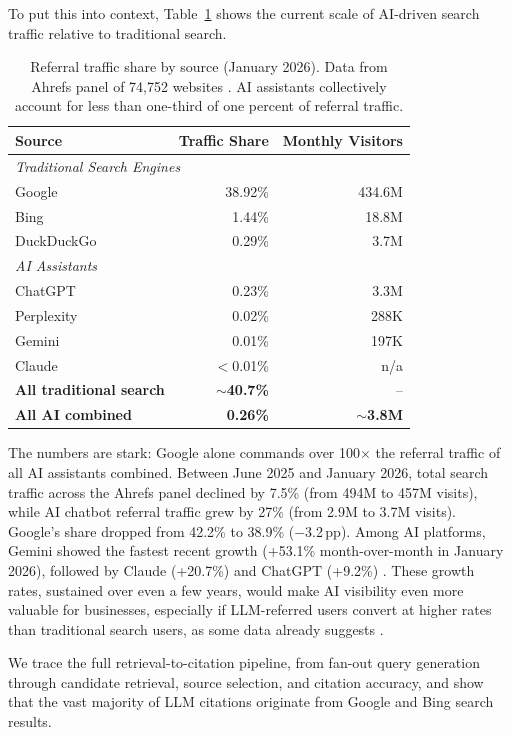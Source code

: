 To put this into context, Table~\ref{tab:traffic-share} shows the current scale of AI-driven search traffic relative to traditional search.
\begin{table}[htbp]
\centering
\caption{Referral traffic share by source (January 2026). Data from Ahrefs panel of 74,752 websites \parencite{ahrefs2026chatgptvsgoogle}. AI assistants collectively account for less than one-third of one percent of referral traffic.}
\label{tab:traffic-share}
\begin{tabular}{lrr}
\toprule
\textbf{Source} & \textbf{Traffic Share} & \textbf{Monthly Visitors} \\
\midrule
\multicolumn{3}{l}{\textit{Traditional Search Engines}} \\
Google & 38.92\% & 434.6M \\
Bing & 1.44\% & 18.8M \\
DuckDuckGo & 0.29\% & 3.7M \\
\midrule
\multicolumn{3}{l}{\textit{AI Assistants}} \\
ChatGPT & 0.23\% & 3.3M \\
Perplexity & 0.02\% & 288K \\
Gemini & 0.01\% & 197K \\
Claude & $<$0.01\% & n/a \\
\midrule
\textbf{All traditional search} & \textbf{$\sim$40.7\%} & -- \\
\textbf{All AI combined} & \textbf{0.26\%} & \textbf{$\sim$3.8M} \\
\bottomrule
\end{tabular}
\end{table}
The numbers are stark: Google alone commands over 100$\times$ the referral traffic of all AI assistants combined. Between June 2025 and January 2026, total search traffic across the Ahrefs panel declined by 7.5\% (from 494M to 457M visits), while AI chatbot referral traffic grew by 27\% (from 2.9M to 3.7M visits). Google's share dropped from 42.2\% to 38.9\% ($-$3.2\,pp). Among AI platforms, Gemini showed the fastest recent growth (+53.1\% month-over-month in January 2026), followed by Claude (+20.7\%) and ChatGPT (+9.2\%) \parencite{ahrefs2026chatgptvsgoogle}. These growth rates, sustained over even a few years, would make AI visibility even more valuable for businesses, especially if LLM-referred users convert at higher rates than traditional search users, as some data already suggests \parencite{law2025aiconversions}.

  We trace the full retrieval-to-citation pipeline, from fan-out query generation through candidate retrieval, source selection, and citation accuracy, and show that the vast majority of LLM citations originate from Google and Bing search results.
